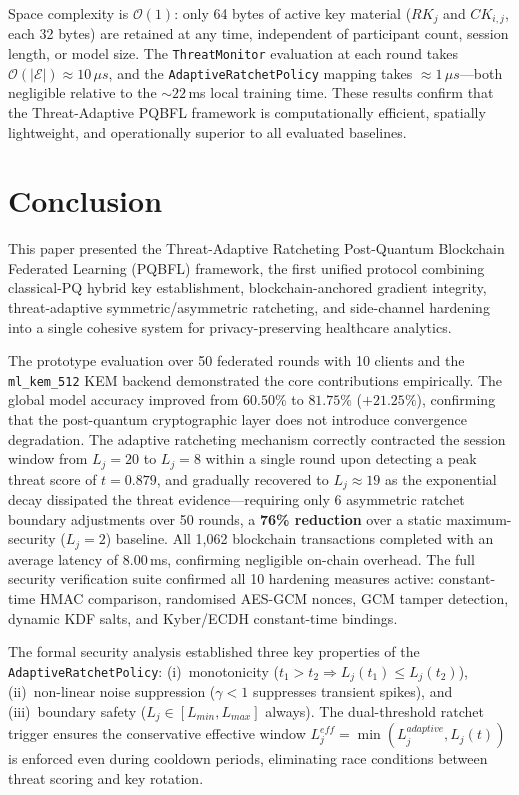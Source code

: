 \documentclass[journal, 10pt, twocolumn]{IEEEtran}
\begin{document}
Space complexity is $\mathcal{O}(1)$: only 64 bytes of active key material ($RK_j$ and $CK_{i,j}$, each 32 bytes) are retained at any time, independent of participant count, session length, or model size. The \texttt{ThreatMonitor} evaluation at each round takes $\mathcal{O}(|\mathcal{E}|) \approx 10\,\mu s$, and the \texttt{AdaptiveRatchetPolicy} mapping takes $\approx 1\,\mu s$---both negligible relative to the $\sim 22$\,ms local training time. These results confirm that the Threat-Adaptive PQBFL framework is computationally efficient, spatially lightweight, and operationally superior to all evaluated baselines.

\section{Conclusion}
This paper presented the Threat-Adaptive Ratcheting Post-Quantum Blockchain Federated Learning (PQBFL) framework, the first unified protocol combining classical-PQ hybrid key establishment, blockchain-anchored gradient integrity, threat-adaptive symmetric/asymmetric ratcheting, and side-channel hardening into a single cohesive system for privacy-preserving healthcare analytics.

The prototype evaluation over 50 federated rounds with 10 clients and the \texttt{ml\_kem\_512} KEM backend demonstrated the core contributions empirically. The global model accuracy improved from $60.50\%$ to $\mathbf{81.75\%}$ ($+21.25\%$), confirming that the post-quantum cryptographic layer does not introduce convergence degradation. The adaptive ratcheting mechanism correctly contracted the session window from $L_j=20$ to $L_j=8$ within a single round upon detecting a peak threat score of $t=0.879$, and gradually recovered to $L_j \approx 19$ as the exponential decay dissipated the threat evidence---requiring only 6 asymmetric ratchet boundary adjustments over 50 rounds, a \textbf{76\% reduction} over a static maximum-security ($L_j=2$) baseline. All 1,062 blockchain transactions completed with an average latency of $\mathbf{8.00}$\,ms, confirming negligible on-chain overhead. The full security verification suite confirmed all 10 hardening measures active: constant-time HMAC comparison, randomised AES-GCM nonces, GCM tamper detection, dynamic KDF salts, and Kyber/ECDH constant-time bindings.

The formal security analysis established three key properties of the \texttt{AdaptiveRatchetPolicy}: (i)~monotonicity ($t_1 > t_2 \Rightarrow L_j(t_1) \leq L_j(t_2)$), (ii)~non-linear noise suppression ($\gamma < 1$ suppresses transient spikes), and (iii)~boundary safety ($L_j \in [L_{min}, L_{max}]$ always). The dual-threshold ratchet trigger ensures the conservative effective window $L_j^{eff} = \min(L_j^{adaptive}, L_j(t))$ is enforced even during cooldown periods, eliminating race conditions between threat scoring and key rotation.
\end{document}

